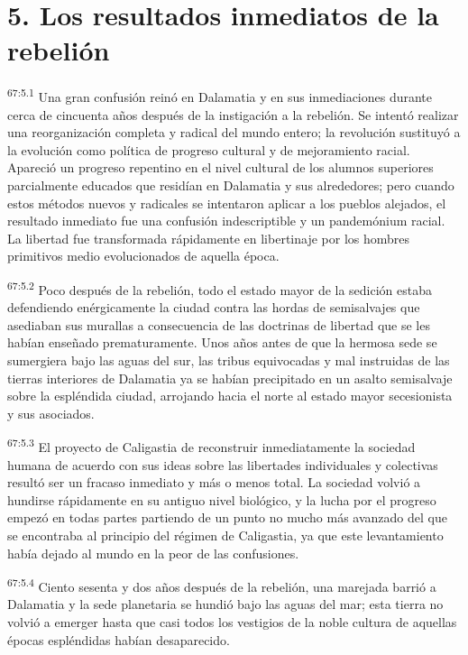 \section*{5. Los resultados inmediatos de la rebelión}
\par
\textsuperscript{67:5.1} Una gran confusión reinó en Dalamatia y en sus inmediaciones durante cerca de cincuenta años después de la instigación a la rebelión. Se intentó realizar una reorganización completa y radical del mundo entero; la revolución sustituyó a la evolución como política de progreso cultural y de mejoramiento racial. Apareció un progreso repentino en el nivel cultural de los alumnos superiores parcialmente educados que residían en Dalamatia y sus alrededores; pero cuando estos métodos nuevos y radicales se intentaron aplicar a los pueblos alejados, el resultado inmediato fue una confusión indescriptible y un pandemónium racial. La libertad fue transformada rápidamente en libertinaje por los hombres primitivos medio evolucionados de aquella época.

\par
\textsuperscript{67:5.2} Poco después de la rebelión, todo el estado mayor de la sedición estaba defendiendo enérgicamente la ciudad contra las hordas de semisalvajes que asediaban sus murallas a consecuencia de las doctrinas de libertad que se les habían enseñado prematuramente. Unos años antes de que la hermosa sede se sumergiera bajo las aguas del sur, las tribus equivocadas y mal instruidas de las tierras interiores de Dalamatia ya se habían precipitado en un asalto semisalvaje sobre la espléndida ciudad, arrojando hacia el norte al estado mayor secesionista y sus asociados.

\par
\textsuperscript{67:5.3} El proyecto de Caligastia de reconstruir inmediatamente la sociedad humana de acuerdo con sus ideas sobre las libertades individuales y colectivas resultó ser un fracaso inmediato y más o menos total. La sociedad volvió a hundirse rápidamente en su antiguo nivel biológico, y la lucha por el progreso empezó en todas partes partiendo de un punto no mucho más avanzado del que se encontraba al principio del régimen de Caligastia, ya que este levantamiento había dejado al mundo en la peor de las confusiones.

\par
\textsuperscript{67:5.4} Ciento sesenta y dos años después de la rebelión, una marejada barrió a Dalamatia y la sede planetaria se hundió bajo las aguas del mar; esta tierra no volvió a emerger hasta que casi todos los vestigios de la noble cultura de aquellas épocas espléndidas habían desaparecido.

